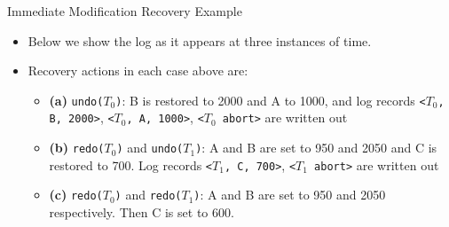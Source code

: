 \documentclass[aspectratio=169, xcolor=dvipsnames]{beamer}
\begin{document}
\begin{frame}{Immediate Modification Recovery Example}
    \begin{itemize}[<+->]
        \item Below we show the log as it appears at three instances of time.
    \end{itemize}
    \begin{itemize}[<+->]
        \item[<3->] Recovery actions in each case above are:
        \begin{itemize}
            \item[$\triangleright$] \textbf{(a)} \texttt{undo($T_0$)}: B is restored to 2000 and A to 1000, and log records \texttt{<$T_0$, B, 2000>}, \texttt{<$T_0$, A, 1000>}, \texttt{<$T_0$ abort>} are written out
            \item[$\triangleright$] \textbf{(b)} \texttt{redo($T_0$)} and \texttt{undo($T_1$)}: A and B are set to 950 and 2050 and C is restored to 700. Log records \texttt{<$T_1$, C, 700>}, \texttt{<$T_1$ abort>} are written out
            \item[$\triangleright$] \textbf{(c)} \texttt{redo($T_0$)} and \texttt{redo($T_1$)}: A and B are set to 950 and 2050 respectively. Then C is set to 600.
        \end{itemize}
    \end{itemize}
\end{frame}
\end{document}
